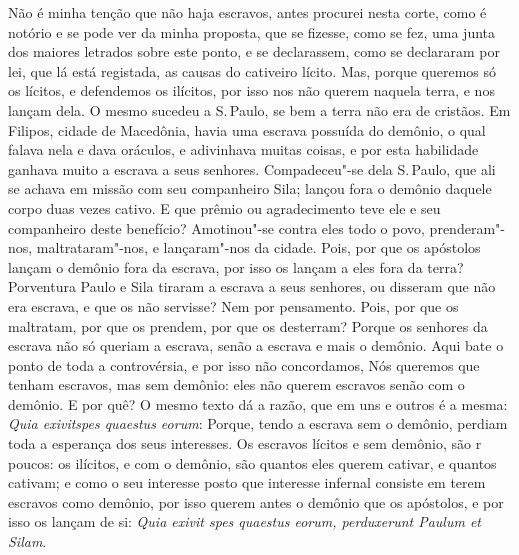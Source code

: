 Não é minha tenção que não haja escravos, antes procurei nesta corte,
como é notório e se pode ver da minha proposta, que se fizesse, como se
fez, uma junta dos maiores letrados sobre este ponto, e se declarassem,
como se declararam por lei, que lá está
registada, as causas do cativeiro lícito. Mas, porque queremos só os
lícitos, e defendemos os ilícitos, por isso nos não querem naquela
terra, e nos lançam dela. O mesmo sucedeu a S.\,Paulo, se bem a terra não
era de cristãos. Em Filipos, cidade de Macedônia, havia uma escrava
possuída do demônio, o qual falava nela e dava oráculos, e adivinhava
muitas coisas, e por esta habilidade ganhava muito a escrava a seus
senhores. Compadeceu"-se dela S.\,Paulo, que ali se achava em missão com
seu companheiro Sila; lançou fora o demônio daquele corpo duas vezes
cativo. E que prêmio ou agradecimento teve ele e seu companheiro deste
benefício? Amotinou"-se contra eles todo o povo, prenderam"-nos,
maltrataram"-nos, e lançaram"-nos da cidade. Pois, por que os apóstolos
lançam o demônio fora da escrava, por isso os lançam a eles fora da
terra? Porventura Paulo e Sila tiraram a escrava a seus senhores, ou
disseram que não era escrava, e que os não servisse? Nem por pensamento.
Pois, por que os maltratam, por que os prendem, por que os desterram?
Porque os senhores da escrava não só queriam a escrava, senão a escrava
e mais o demônio. Aqui bate o ponto de toda a controvérsia, e por isso
não concordamos, Nós queremos que tenham escravos, mas sem demônio: eles
não querem escravos senão com o demônio. E por quê? O mesmo texto dá a
razão, que em uns e outros é a mesma: \emph{Quia exivitspes quaestus
eorum}: Porque, tendo a escrava sem o demônio, perdiam toda
a esperança dos seus interesses. Os escravos lícitos e sem demônio, são
r poucos: os ilícitos, e com o demônio, são quantos eles querem cativar,
e quantos cativam; e como o seu interesse posto que interesse infernal
consiste em terem escravos como demônio, por isso querem antes o demônio
que os apóstolos, e por isso os lançam de si: \emph{Quia exivit spes
quaestus eorum, perduxerunt Paulum et Silam}.

